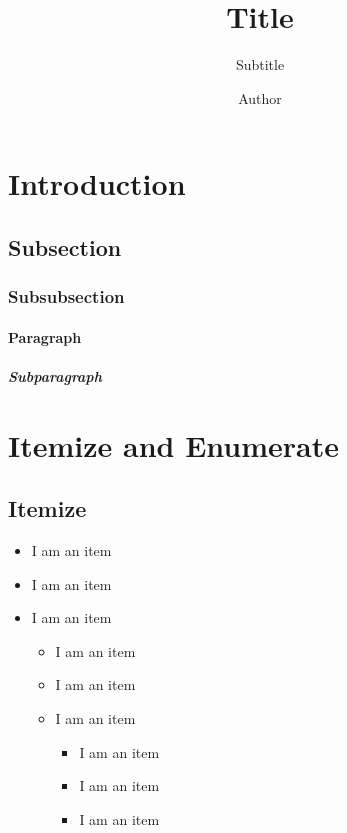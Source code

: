 \documentclass[a4paper,10pt,oneside]{scrartcl}
\title{Title}
\subtitle{Subtitle}
\author{Author \matrikelnr{12345678}}
\begin{document}
\maketitle
\tableofcontents

\section{Introduction}
\lipsum[1-1]

\subsection{Subsection}
\lipsum[2-3]

\subsubsection{Subsubsection}
\lipsum[2-3]

\paragraph{Paragraph}
\lipsum[1-2]

\subparagraph{Subparagraph}
\lipsum[1-2]

\section{Itemize and Enumerate}
\subsection{Itemize}
\begin{itemize}
  \item I am an item
  \item I am an item
  \item I am an item
        \begin{itemize}
          \item I am an item
          \item I am an item
          \item I am an item
                \begin{itemize}
                  \item I am an item
                  \item I am an item
                  \item I am an item
                \end{itemize}
        \end{itemize}
\end{itemize}
\end{document}
